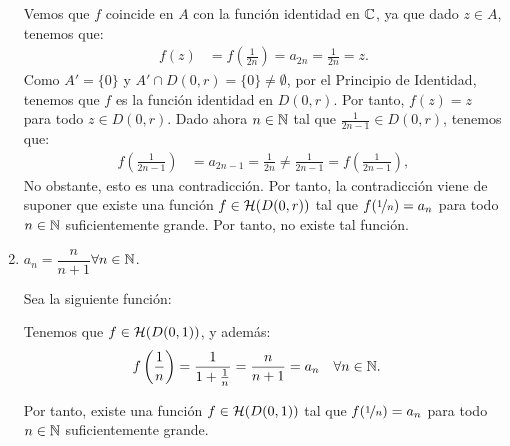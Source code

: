 \begin{ejercicio}
\begin{enumerate}
        Vemos que $f$ coincide en $A$ con la función identidad en $\mathbb{C}$, ya que dado $z\in A$, tenemos que:
        \begin{align*}
            f(z) &= f\left(\frac{1}{2n}\right) = a_{2n} = \frac{1}{2n} = z.
        \end{align*}
        Como $A'=\{0\}$ y $A'\cap D(0,r)=\{0\}\neq \emptyset$, por el Principio de Identidad, tenemos que $f$ es la función identidad en $D(0,r)$. Por tanto, $f(z)=z$ para todo $z\in D(0,r)$. Dado ahora $n\in \mathbb{N}$ tal que $\frac{1}{2n-1}\in D(0,r)$, tenemos que:
        \begin{align*}
            f\left(\frac{1}{2n-1}\right) &= a_{2n-1} = \frac{1}{2n}\neq \frac{1}{2n-1} = f\left(\frac{1}{2n-1}\right),
        \end{align*}
        No obstante, esto es una contradicción. Por tanto, la contradicción viene de suponer que existe una función $f\in \mathcal{H}(D(0,r))$ tal que $f(\nicefrac{1}{n})=a_n$ para todo $n\in \mathbb{N}$ suficientemente grande. Por tanto, no existe tal función.
        \item $a_n=\dfrac{n}{n+1}$\qquad $\forall n\in \mathbb{N}$.
        
        Sea la siguiente función:

        Tenemos que $f\in \mathcal{H}(D(0,1))$, y además:
        \begin{align*}
            f\left(\frac{1}{n}\right) &= \frac{1}{1+\frac{1}{n}} = \frac{n}{n+1} = a_n \quad \forall n\in \mathbb{N}.
        \end{align*}

        Por tanto, existe una función $f\in \mathcal{H}(D(0,1))$ tal que $f(\nicefrac{1}{n})=a_n$ para todo $n\in \mathbb{N}$ suficientemente grande.
    \end{enumerate}
\end{ejercicio}

